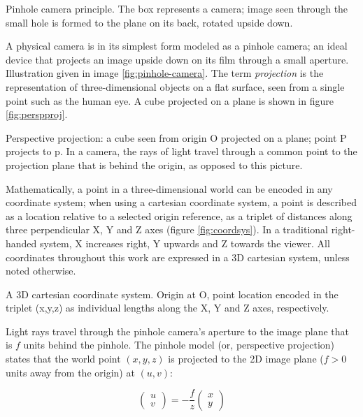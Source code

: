 

{Pinhole camera principle. The box represents a camera; image seen through the small hole is formed to the plane on its back, rotated upside down.}

A physical camera is in its simplest form modeled as a pinhole camera; an ideal device that projects an image upside down on its film through a small aperture.
Illustration given in image \ref{fig:pinhole-camera}.
The term \emph{projection} is the representation of three-dimensional objects on a flat surface, seen from a single point such as the human eye.
A cube projected on a plane is shown in figure \ref{fig:perspproj}.

{Perspective projection: a cube seen from origin O projected on a plane; point P projects to p. In a camera, the rays of light travel through a common point to the projection plane that is behind the origin, as opposed to this picture.}



Mathematically, a point in a three-dimensional world can be encoded in any coordinate system;
when using a cartesian coordinate system, a point is described as a location relative to a selected origin reference, as a triplet of distances along three perpendicular X, Y and Z axes (figure \ref{fig:coordsys}).
In a traditional right-handed system, X increases right, Y upwards and Z towards the viewer.
All coordinates throughout this work are expressed in a 3D cartesian system, unless noted otherwise.

{A 3D cartesian coordinate system. Origin at O, point location encoded in the triplet (x,y,z) as individual lengths along the X, Y and Z axes, respectively.}


Light rays travel through the pinhole camera's aperture to the image plane that is $f$ units behind the pinhole.
The pinhole model (or, perspective projection) states that the world point $(x, y, z)$ is projected to the 2D image plane ($f > 0$ units away from the origin) at $(u, v)$:

\begin{equation}
\begin{pmatrix}
u \\ v
\end{pmatrix}
=
-\frac{f}{z} \begin{pmatrix}
x \\ y
\end{pmatrix}
\end{equation}


